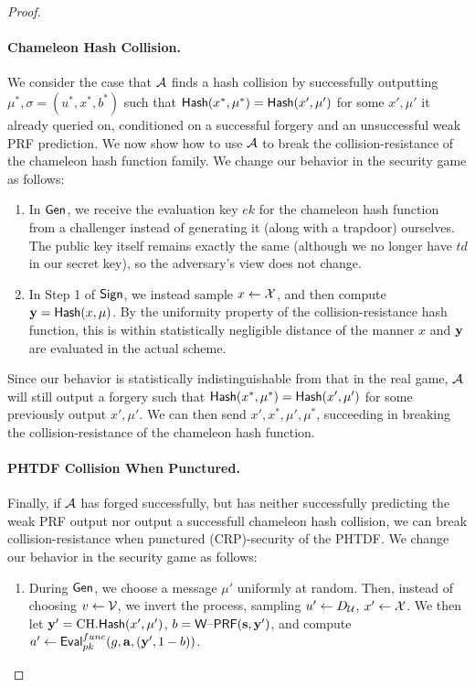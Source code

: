 \begin{proof}
\paragraph{Chameleon Hash Collision.} We consider the case that  $\mathcal{A}$ finds a hash
collision by successfully outputting $\mu^*,\sigma=(u^*,x^*,b^*)$ such that
$\mathsf{Hash}(x^*,\mu^*)=\mathsf{Hash}(x',\mu')$ for some $x',\mu'$ it already
queried on,  conditioned on a successful forgery and an unsuccessful weak
PRF prediction. We now show how to use $\mathcal{A}$ to
break the collision-resistance of the chameleon hash function
family. We change our behavior in the security game as follows:
\begin{enumerate}
\item In $\mathsf{Gen}$, we receive the evaluation key $ek$ for the
  chameleon hash function from a challenger instead of generating it
  (along with a trapdoor) ourselves. The public key itself remains
  exactly the same (although we no longer have $td$ in our secret
  key), so the adversary's view does not change.
\item In Step 1 of $\mathsf{Sign}$, we instead sample $x \gets
\mathcal{X}$, and then compute $\mathbf{y} = \mathsf{Hash}(x,\mu)$. By the uniformity
property of the collision-resistance hash function, this is within
statistically negligible distance of the manner $x$ and $\mathbf{y}$ are
evaluated in the actual scheme.
\end{enumerate}
Since our behavior is statistically indistinguishable from that in the
real game, $\mathcal{A}$ will still output a forgery such that 
$\mathsf{Hash}(x^*,\mu^*)=\mathsf{Hash}(x',\mu')$ for some previously output $x',
\mu'$. We can then send
$x',x^*,\mu',\mu^*$, succeeding in breaking the collision-resistance
of the chameleon hash function. 

\paragraph{PHTDF Collision When Punctured.} Finally, if $\mathcal{A}$ has
forged successfully, but has neither successfully predicting the weak
PRF output nor output  a successfull chameleon hash collision,
we can break collision-resistance when punctured (CRP)-security of the
PHTDF. We change our behavior in the security game as follows:
\begin{enumerate}
\item During $\mathsf{Gen}$, we choose a message $\mu'$ uniformly at
  random. Then, instead of choosing $v \gets \mathcal{V}$, 
we invert the process,  sampling
  $u' \gets D_{\mathcal{U}}$, $x' \gets \mathcal{X}$. We then let
  $\mathbf{y}'=\text{CH}.\mathsf{Hash}(x',\mu')$, $b=\mathsf{W\text{\textendash}PRF}(\mathbf{s},\mathbf{y}')$, and compute
  $a' \gets \mathsf{Eval}_{pk}^{func}(g,\mathbf{a},(\mathbf{y}',1-b))$. 


\end{enumerate}
\end{proof}
